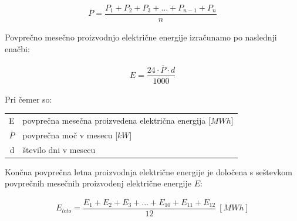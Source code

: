 \begin{ceqn}
\begin{align}
\overline{P} = \dfrac{P_1 + P_2 + P_3 + ... + P_{n-1} + P_n}{n}
\end{align}
\end{ceqn}



Povprečno mesečno proizvodnjo električne energije izračunamo po naslednji enačbi:

\begin{ceqn}
\begin{align}
E = \dfrac{24 \cdot \overline{P} \cdot d}{1000}
\end{align}
\end{ceqn}

Pri čemer so:
\begin{table}[htb!]
\begin{tabular}{r|p{10cm}}
	E & povprečna mesečna proizvedena električna energija [$MWh$]\\
	$\overline{P}$ & povprečna moč v mesecu [$kW$]\\
	d & število dni v mesecu \\
\end{tabular}
\end{table}


Končna povprečna letna proizvodnja električne energije je določena s seštevkom povprečnih mesečnih proizvodenj električne energije $E$:

\begin{ceqn}
\begin{align}
 E_{leto} =  \dfrac{E_1 + E_2 + E_3 + ... + E_{10} + E_{11} + E_{12}}{12} ~[MWh]
\end{align}
\end{ceqn}

